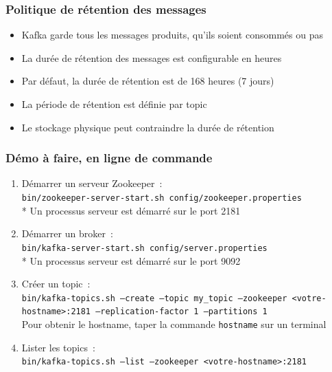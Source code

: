 \documentclass{beamer}
\begin{document}
\begin{frame}
	\frametitle{Politique de rétention des messages}
	\begin{itemize}
		\item Kafka garde tous les messages produits, qu'ils soient consommés ou pas
		\item La durée de rétention des messages est configurable en heures
		\item Par défaut, la durée de rétention est de 168 heures (7 jours)
		\item La période de rétention est définie par topic
		\item Le stockage physique peut contraindre la durée de rétention
	\end{itemize}
\end{frame} 

\begin{frame}
	\frametitle{Démo à faire, en ligne de commande}
	\begin{enumerate}
		\item Démarrer un serveur Zookeeper~:\\
		\footnotesize
		\texttt{bin/zookeeper-server-start.sh config/zookeeper.properties}\\
		* Un processus serveur est démarré sur le port 2181
		\normalsize
		\item Démarrer un broker~:\\
		\footnotesize
		\texttt{bin/kafka-server-start.sh config/server.properties}\\
		* Un processus serveur est démarré sur le port 9092
		\normalsize
		\item Créer un topic~:\\
		\footnotesize
		\texttt{bin/kafka-topics.sh ---create ---topic my\_topic ---zookeeper <votre-hostname>:2181 ---replication-factor 1 ---partitions 1}\\
		\normalsize
		Pour obtenir le hostname, taper la commande \texttt{hostname} sur un terminal
		\item Lister les topics~:\\
		\footnotesize
		\texttt{bin/kafka-topics.sh ---list ---zookeeper <votre-hostname>:2181}
		\normalsize
	\end{enumerate}

\end{frame} 
		
\end{document}
